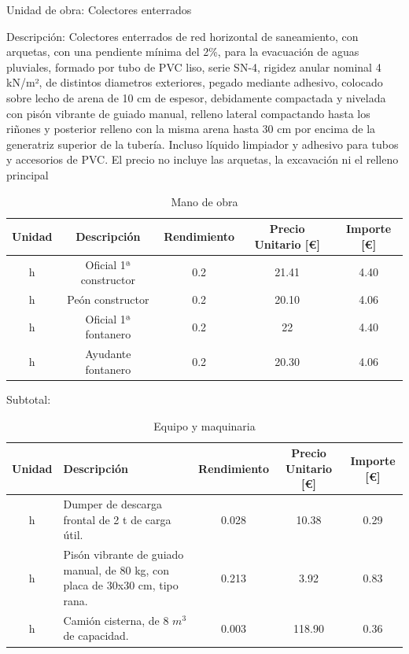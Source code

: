 \documentclass[../main.tex]{subfiles}
\begin{document}
Unidad de obra: Colectores enterrados

Descripción: Colectores enterrados de red horizontal de saneamiento, con arquetas, con una pendiente mínima del 2\%, para la evacuación de aguas pluviales, formado por tubo de PVC liso, serie SN-4, rigidez anular nominal 4 kN/m², de distintos diametros exteriores, pegado mediante adhesivo, colocado sobre lecho de arena de 10 cm de espesor, debidamente compactada y nivelada con pisón vibrante de guiado manual, relleno lateral compactando hasta los riñones y posterior relleno con la misma arena hasta 30 cm por encima de la generatriz superior de la tubería. Incluso líquido limpiador y adhesivo para tubos y accesorios de PVC. El precio no incluye las arquetas, la excavación ni el relleno principal

\begin{table}[H]
    \centering
    \begin{tabular}{c|c|c|c|c}
    Unidad & Descripción & Rendimiento & Precio Unitario [€] & Importe [€] \\ \hline
    h&Oficial 1ª constructor & 0.2 & 21.41 & 4.40 \\
    h&Peón constructor & 0.2 & 20.10 & 4.06 \\
    h&Oficial 1ª fontanero & 0.2 & 22 & 4.40 \\
    h&Ayudante fontanero & 0.2 & 20.30 & 4.06 \\
    
    \end{tabular}
    \caption{Mano de obra}
\end{table}

Subtotal:

\begin{table}[H]
    \centering
    \begin{tabular}{c|p{5.5cm}|c|c|c}
    Unidad & Descripción & Rendimiento & Precio Unitario [€] & Importe [€] \\ \hline
    h& Dumper de descarga frontal de 2 t de carga útil. & 0.028 & 10.38 & 0.29 \\
    h&Pisón vibrante de guiado manual, de 80 kg, con placa de 30x30 cm, tipo rana. & 0.213 & 3.92 & 0.83 \\
    h&Camión cisterna, de 8 $m^3$ de capacidad. & 0.003 & 118.90 & 0.36 \\
    
    \end{tabular}
    \caption{Equipo y maquinaria}
\end{table}
\end{document}
